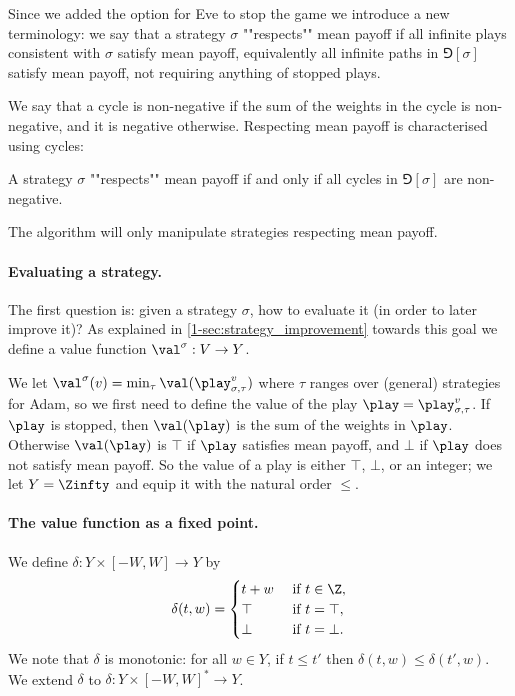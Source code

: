 Since we added the option for Eve to stop the game we introduce a new terminology: 
we say that a strategy $\sigma$ ""respects"" mean payoff if all infinite plays consistent with $\sigma$ satisfy mean payoff,
equivalently all infinite paths in $\Game[\sigma]$ satisfy mean payoff, not requiring anything of stopped plays.

We say that a cycle is non-negative if the sum of the weights in the cycle is non-negative, and it is negative otherwise. 
Respecting mean payoff is characterised using cycles:
\begin{fact}\label{4-fact:characterisation}
A strategy $\sigma$ ""respects"" mean payoff if and only if all cycles in $\Game[\sigma]$ are non-negative.
\end{fact}
The algorithm will only manipulate strategies respecting mean payoff.

\paragraph{\bf Evaluating a strategy.}
The first question is: given a strategy $\sigma$, how to evaluate it (in order to later improve it)?
As explained in \cref{1-sec:strategy_improvement} towards this goal we define a value function $\val^{\sigma} : V \to Y$.

We let $\val^{\sigma}(v) = \min_\tau \val(\play_{\sigma,\tau}^v)$ where $\tau$ ranges over (general) strategies for Adam, so we first need to define the value of the play $\play = \play_{\sigma,\tau}^v$.
If $\play$ is stopped, then $\val(\play)$ is the sum of the weights in $\play$.
Otherwise $\val(\play)$ is $\top$ if $\play$ satisfies mean payoff, and $\bot$ if $\play$ does not satisfy mean payoff.
So the value of a play is either $\top$, $\bot$, or an integer;
we let $Y = \Zinfty$ and equip it with the natural order $\le$.

\paragraph{\bf The value function as a fixed point.}
We define $\delta : Y \times [-W,W] \to Y$ by 
\[
\delta(t,w) = 
\begin{cases}
t + w & \text{ if } t \in \Z, \\
\top & \text{ if } t = \top, \\
\bot & \text{ if } t = \bot.
\end{cases}
\]
We note that $\delta$ is monotonic: for all $w \in Y$,
if $t \le t'$ then $\delta(t,w) \le \delta(t',w)$. 
We extend $\delta$ to $\delta : Y \times [-W,W]^* \to Y$.

